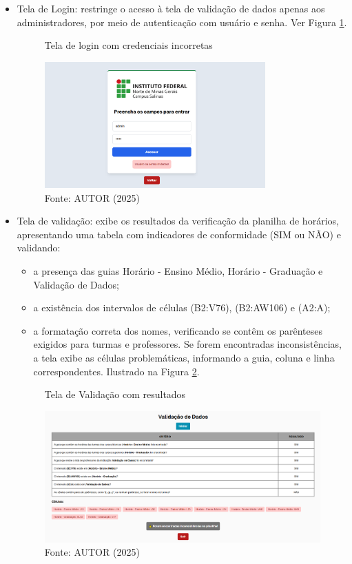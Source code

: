 \begin{itemize}
    \item Tela de Login: restringe o acesso à tela de validação de dados apenas aos administradores, por meio de autenticação com usuário e senha. Ver Figura \ref{fig_front_21}.

    \begin{figure}[htb]
        \centering
        \caption{Tela de login com credenciais incorretas}
        \includegraphics[width=0.8\textwidth]{Figuras/front-21.png}
        \caption*{Fonte: AUTOR (2025)}
        \label{fig_front_21}
    \end{figure}
    
    \item Tela de validação: exibe os resultados da verificação da planilha de horários, apresentando uma tabela com indicadores de conformidade (SIM ou NÃO) e validando:
    \begin{itemize}
        \item a presença das guias Horário - Ensino Médio, Horário - Graduação e Validação de Dados;
        \item a existência dos intervalos de células (B2:V76), (B2:AW106) e (A2:A);
        \item a formatação correta dos nomes, verificando se contêm os parênteses exigidos para turmas e professores. Se forem encontradas inconsistências, a tela exibe as células problemáticas, informando a guia, coluna e linha correspondentes. Ilustrado na Figura \ref{fig_front_22}.
    \end{itemize}

    \begin{figure}[htb]
        \centering
        \caption{Tela de Validação com resultados}
        \includegraphics[width=1\textwidth]{Figuras/front-22.png}
        \caption*{Fonte: AUTOR (2025)}
        \label{fig_front_22}
    \end{figure}
\end{itemize}

